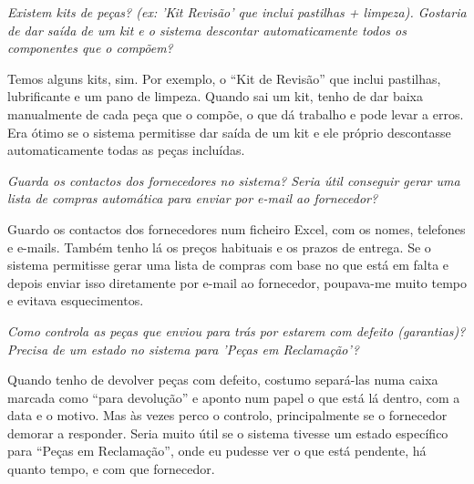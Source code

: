 \documentclass[11pt,a4paper]{article}
\newcommand{\pergunta}[1]{\item[E:] \textit{#1}}
\newcommand{\resposta}[1]{\item[R:] #1}
\begin{document}
\begin{transcription}
		\pergunta{Existem kits de peças? (ex: 'Kit Revisão' que inclui pastilhas + limpeza). Gostaria de dar saída de um kit e o sistema descontar automaticamente todos os componentes que o compõem?}
		\resposta{Temos alguns kits, sim. Por exemplo, o “Kit de Revisão” que inclui pastilhas, lubrificante e um pano de limpeza. Quando sai um kit, tenho de dar baixa manualmente de cada peça que o compõe, o que dá trabalho e pode levar a erros. Era ótimo se o sistema permitisse dar saída de um kit e ele próprio descontasse automaticamente todas as peças incluídas.}
		
		\pergunta{Guarda os contactos dos fornecedores no sistema? Seria útil conseguir gerar uma lista de compras automática para enviar por e-mail ao fornecedor?}
		\resposta{Guardo os contactos dos fornecedores num ficheiro Excel, com os nomes, telefones e e-mails. Também tenho lá os preços habituais e os prazos de entrega. Se o sistema permitisse gerar uma lista de compras com base no que está em falta e depois enviar isso diretamente por e-mail ao fornecedor, poupava-me muito tempo e evitava esquecimentos.}
		
		\pergunta{Como controla as peças que enviou para trás por estarem com defeito (garantias)? Precisa de um estado no sistema para 'Peças em Reclamação'?}
		\resposta{Quando tenho de devolver peças com defeito, costumo separá-las numa caixa marcada como “para devolução” e aponto num papel o que está lá dentro, com a data e o motivo. Mas às vezes perco o controlo, principalmente se o fornecedor demorar a responder. Seria muito útil se o sistema tivesse um estado específico para “Peças em Reclamação”, onde eu pudesse ver o que está pendente, há quanto tempo, e com que fornecedor.}
		
		
	\end{transcription}
	
%	
%	
\end{document}
